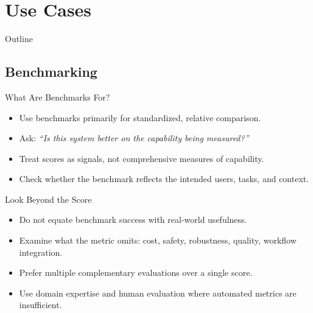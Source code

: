 \documentclass[24pt]{beamer}
\newcommand{\sectionslide}{
	\begin{frame}{Outline}
		\tableofcontents[currentsection]
\end{frame}
}
\newcommand{\subsectionslide}{
	 \begin{frame}
		\sectionpage
		\subsectionpage
	\end{frame}
}
\begin{document}
\section{Use Cases}
\sectionslide

\subsection{Benchmarking}
\subsectionslide


\begin{frame}{What Are Benchmarks For?}
	\begin{itemize}
		\item Use benchmarks primarily for \alert{standardized, relative comparison}.
		\item Ask: \emph{``Is this system better on the capability being measured?''}
		\item Treat scores as \alert{signals}, not comprehensive measures of capability.
		\item Check whether the benchmark reflects the intended users, tasks, and context.
	\end{itemize}
\end{frame}

\begin{frame}{Look Beyond the Score}
	\begin{itemize}
		\item Do not equate benchmark success with real-world usefulness.
		\item Examine what the metric \alert{omits}: cost, safety, robustness, quality, workflow integration.
		\item Prefer \alert{multiple complementary evaluations} over a single score.
		\item Use domain expertise and human evaluation where automated metrics are insufficient.
	\end{itemize}
\end{frame}
\end{document}
